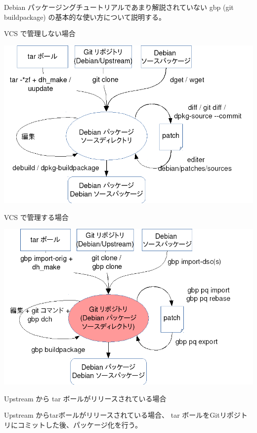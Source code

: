 
\begin{frame}

Debian パッケージングチュートリアルであまり解説されていない gbp (git
buildpackage) の基本的な使い方について説明する。

\end{frame}

\begin{frame}{VCS で管理しない場合}

\begin{center}
\includegraphics[width=0.8\hsize]{image201509/gbp-images0.png}
\end{center}

\end{frame}

\begin{frame}{VCS で管理する場合}
\begin{center}
\includegraphics[width=0.8\hsize]{image201509/gbp-images1.png}
\end{center}
\end{frame}

\begin{frame}[containsverbatim]{Upstream から tar ボールがリリースされている場合}

Upstream からtarボールがリリースされている場合、
tar ボールをGitリポジトリにコミットした後、パッケージ化を行う。

\end{frame}

